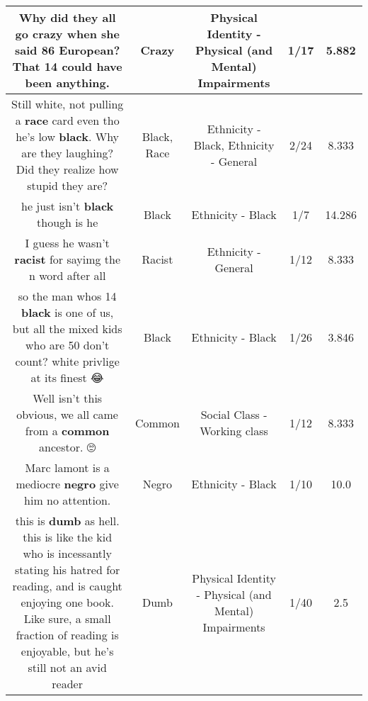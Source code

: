 \documentclass[11pt]{article}
\newlength\mylength
\begin{document}
\begin{center}
\begin{longtable}{|C{.65\mylength}|C{.30\mylength}|C{.12\mylength}|C{.12\mylength}|C{.12\mylength}|}
  \small Why did they all go \textbf{crazy} when she said 86 European? That 14 could have been anything.\normalsize   & Crazy & Physical Identity - Physical (and Mental) Impairments & 1/17 & 5.882 \\  \hline
  \small Still white, not pulling a \textbf{race} card even tho he's low  \textbf{black}. Why are they laughing? Did they realize how stupid they are?\normalsize   & Black, Race & Ethnicity - Black, Ethnicity - General & 2/24 & 8.333 \\  \hline
  \small he just isn't \textbf{black} though is he\normalsize   & Black & Ethnicity - Black & 1/7 & 14.286 \\  \hline
  \small I guess he wasn't \textbf{racist} for sayimg the n word after all\normalsize   & Racist & Ethnicity - General & 1/12 & 8.333 \\  \hline
  \small so the man whos 14 \textbf{black} is one of us, but all the mixed kids who are 50 don't count? white privlige at its finest 😂\normalsize   & Black & Ethnicity - Black & 1/26 & 3.846 \\  \hline
  \small Well isn't this obvious, we all came from a \textbf{common} ancestor. 🙄\normalsize   & Common & Social Class - Working class & 1/12 & 8.333 \\  \hline
  \small Marc lamont is a mediocre \textbf{negro} give him no attention.\normalsize   & Negro & Ethnicity - Black & 1/10 & 10.0 \\  \hline
  \small this is \textbf{dumb} as hell. this is like the kid who is incessantly stating his hatred for reading, and is caught enjoying one book. Like sure, a small fraction of reading is enjoyable, but he's still not an avid reader\normalsize   & Dumb & Physical Identity - Physical (and Mental) Impairments & 1/40 & 2.5 \\  \hline

\end{longtable}
\end{center}
\end{document}
